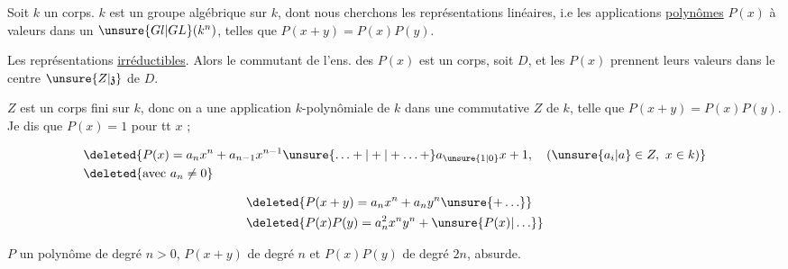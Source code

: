

Soit $k$ un corps. $k$ est un groupe algébrique sur $k$, dont nous cherchons les représentations linéaires, i.e les applications \uline{polynômes} $P(x)$ à valeurs dans un $\unsure{Gl|GL}(k^n)$, telles que $P(x+y)=P(x)P(y)$.

Les représentations \uline{irréductibles}. Alors le commutant  de l'ens. des $P(x)$ est un corps,  soit $D$, et les $P(x)$ prennent leurs valeurs dans le centre $\unsure{Z|\mathfrak z}$ de $D$. 

$Z$ est un corps  fini sur $k$, donc on a une application $k$-polynômiale de $k$ dans une  commutative $Z$ de $k$, telle que $P(x+y)=P(x)P(y)$.  Je dis que $P(x)=1$ pour tt $x$ ;


 

\[\begin{aligned} &\deleted{P(x)=a_n x^n+a_{n-1}x^{n-1}\unsure{\ldots+|+|+\ldots+}a_{\unsure{1|0}}x+1,\quad(\unsure{a_i|a}\in Z,\ x\in k)}\\ &\deleted{\text{avec }a_n\ne 0} \end{aligned}\]

\[\begin{aligned}&\deleted{P(x+y)=a_n x^n+a_n y^n\unsure{+\ldots}}\\ &\deleted{P(x)P(y)=a_n^2 x^n y^n+\unsure{P(x)|\ldots}}\end{aligned}\]

$P$  un polynôme de degré $n>0$, $P(x+y)$  de degré $n$ et $P(x)P(y)$ de degré $2n$, absurde.

